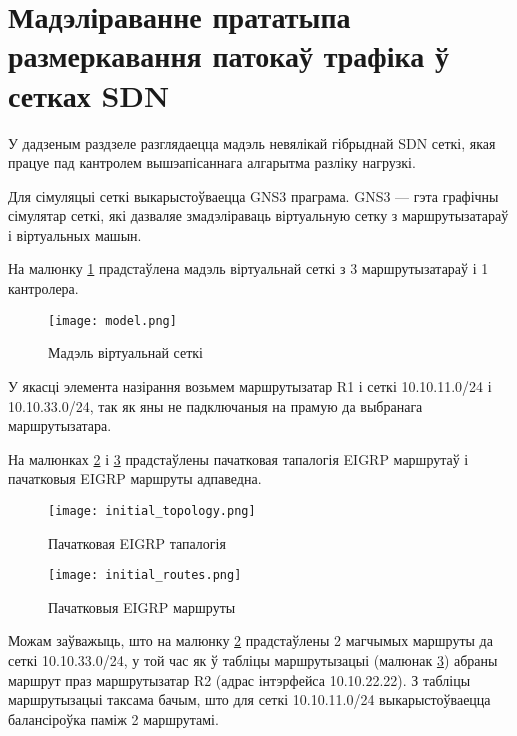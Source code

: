 \section{Мадэліраванне прататыпа размеркавання патокаў трафіка ў сетках SDN}

У дадзеным раздзеле разглядаецца мадэль невялікай гібрыднай SDN сеткі, якая працуе
пад кантролем вышэапісаннага алгарытма разліку нагрузкі.

Для сімуляцыі сеткі выкарыстоўваецца GNS3 праграма.
GNS3 --- гэта графічны сімулятар сеткі, які дазваляе змадэліраваць віртуальную
сетку з маршрутызатараў і віртуальных машын.

На малюнку \ref{img: model} прадстаўлена мадэль віртуальнай сеткі з 3 маршрутызатараў і 1 кантролера.

\begin{figure}[h!]
    \centering
    \texttt{[image: model.png]}
    \caption{Мадэль віртуальнай сеткі}
    \label{img: model} 
\end{figure}

У якасці элемента назірання возьмем маршрутызатар R1 і сеткі 10.10.11.0/24 і 10.10.33.0/24,
так як яны не падключаныя на прамую да выбранага маршрутызатара.

На малюнках \ref{img: initial topology} і \ref{img: initial routes} прадстаўлены
пачатковая тапалогія EIGRP маршрутаў і пачатковыя EIGRP маршруты адпаведна.

\clearpage

\begin{figure}[h!]
    \centering
    \texttt{[image: initial\_topology.png]}
    \caption{Пачатковая EIGRP тапалогія}
    \label{img: initial topology} 
\end{figure}

\vspace{-\baselineskip}

\begin{figure}[h!]
    \centering
    \texttt{[image: initial\_routes.png]}
    \caption{Пачатковыя EIGRP маршруты}
    \label{img: initial routes} 
\end{figure}

Можам заўважыць, што на малюнку \ref{img: initial topology} прадстаўлены 2 магчымых
маршруты да сеткі 10.10.33.0/24, у той час як ў табліцы маршрутызацыі (малюнак
\ref{img: initial routes}) абраны маршрут праз маршрутызатар R2 (адрас інтэрфейса 10.10.22.22). З табліцы маршрутызацыі таксама бачым, што для сеткі 10.10.11.0/24 выкарыстоўваецца балансіроўка паміж 2 маршрутамі.

